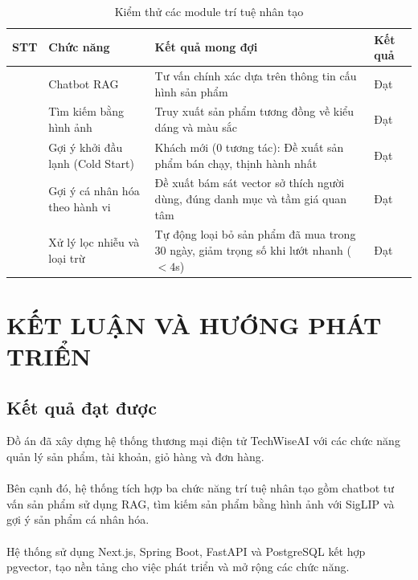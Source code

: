 \documentclass{report}
\begin{document}
\begin{table}[htbp]
    \centering
    \caption{Kiểm thử các module trí tuệ nhân tạo}
    \label{tab:ai-testing}
    \renewcommand{\arraystretch}{1.3}
    \begin{tabularx}{\textwidth}{|>{\centering\arraybackslash}p{1.2cm}|p{3.8cm}|X|>{\centering\arraybackslash}p{1.8cm}|}
        \hline
        \textbf{STT} &
        \textbf{Chức năng} &
        \textbf{Kết quả mong đợi} &
        \textbf{Kết quả} \\
        \hline
        1 & Chatbot RAG &
        Tư vấn chính xác dựa trên thông tin cấu hình sản phẩm & Đạt \\
        \hline
        2 & Tìm kiếm bằng hình ảnh &
        Truy xuất sản phẩm tương đồng về kiểu dáng và màu sắc & Đạt \\
        \hline
        3 & Gợi ý khởi đầu lạnh (Cold Start) &
        Khách mới (0 tương tác): Đề xuất sản phẩm bán chạy, thịnh hành nhất & Đạt \\
        \hline
        4 & Gợi ý cá nhân hóa theo hành vi &
        Đề xuất bám sát vector sở thích người dùng, đúng danh mục và tầm giá quan tâm & Đạt \\
        \hline
        5 & Xử lý lọc nhiễu và loại trừ &
        Tự động loại bỏ sản phẩm đã mua trong 30 ngày, giảm trọng số khi lướt nhanh ($< 4$s) & Đạt \\
        \hline
    \end{tabularx}
\end{table}




\chapter{KẾT LUẬN VÀ HƯỚNG PHÁT TRIỂN}

\section{Kết quả đạt được}
Đồ án đã xây dựng hệ thống thương mại điện tử
TechWiseAI với các chức năng quản lý sản phẩm,
tài khoản, giỏ hàng và đơn hàng.\\\\
Bên cạnh đó, hệ thống tích hợp ba chức năng
trí tuệ nhân tạo gồm chatbot tư vấn sản phẩm
sử dụng RAG, tìm kiếm sản phẩm bằng hình ảnh
với SigLIP và gợi ý sản phẩm cá nhân hóa.\\\\
Hệ thống sử dụng Next.js, Spring Boot, FastAPI
và PostgreSQL kết hợp pgvector, tạo nền tảng
cho việc phát triển và mở rộng các chức năng.
\end{document}
